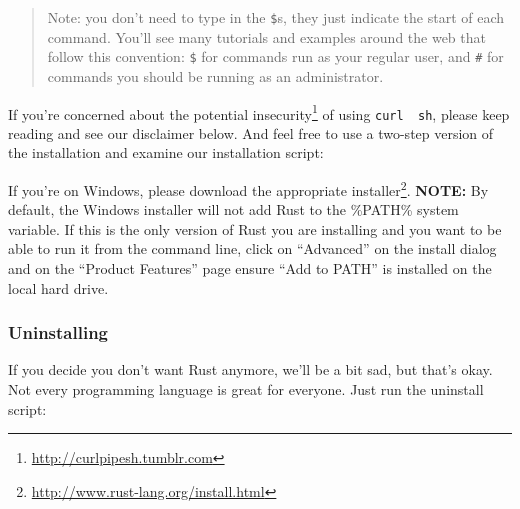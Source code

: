 \documentclass[a4paper,]{book}
\newenvironment{Shaded}{\begin{snugshade}}{\end{snugshade}}
\newcommand{\KeywordTok}[1]{\textcolor[rgb]{0.13,0.29,0.53}{\textbf{{#1}}}}
\newcommand{\NormalTok}[1]{{#1}}
\renewcommand{\href}[2]{#2\footnote{\url{#1}}}
\begin{document}
\begin{quote}
Note: you don't need to type in the \texttt{\$}s, they just indicate the
start of each command. You'll see many tutorials and examples around the
web that follow this convention: \texttt{\$} for commands run as your
regular user, and \texttt{\#} for commands you should be running as an
administrator.
\end{quote}

\begin{Shaded}
\end{Shaded}

If you're concerned about the
\href{http://curlpipesh.tumblr.com}{potential insecurity} of using
\texttt{curl\ \textbar{}\ sh}, please keep reading and see our
disclaimer below. And feel free to use a two-step version of the
installation and examine our installation script:

\begin{Shaded}
\end{Shaded}

If you're on Windows, please download the appropriate
\href{http://www.rust-lang.org/install.html}{installer}. \textbf{NOTE:}
By default, the Windows installer will not add Rust to the \%PATH\%
system variable. If this is the only version of Rust you are installing
and you want to be able to run it from the command line, click on
``Advanced'' on the install dialog and on the ``Product Features'' page
ensure ``Add to PATH'' is installed on the local hard drive.

\subsubsection{Uninstalling}\label{uninstalling}

If you decide you don't want Rust anymore, we'll be a bit sad, but
that's okay. Not every programming language is great for everyone. Just
run the uninstall script:

\begin{Shaded}
\end{Shaded}
\end{document}
